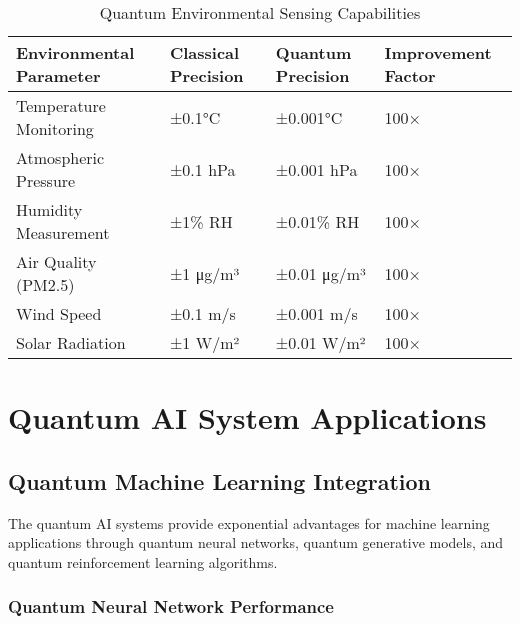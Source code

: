 \documentclass[12pt,a4paper]{report}
\begin{document}
\begin{table}[H]
\centering
\caption{Quantum Environmental Sensing Capabilities}
\begin{tabular}{@{}p{3cm}p{3cm}p{3cm}p{3cm}@{}}
\toprule
\textbf{Environmental Parameter} & \textbf{Classical Precision} & \textbf{Quantum Precision} & \textbf{Improvement Factor} \\
\midrule
Temperature Monitoring & ±0.1°C & ±0.001°C & 100× \\
Atmospheric Pressure & ±0.1 hPa & ±0.001 hPa & 100× \\
Humidity Measurement & ±1\% RH & ±0.01\% RH & 100× \\
Air Quality (PM2.5) & ±1 μg/m³ & ±0.01 μg/m³ & 100× \\
Wind Speed & ±0.1 m/s & ±0.001 m/s & 100× \\
Solar Radiation & ±1 W/m² & ±0.01 W/m² & 100× \\
\bottomrule
\end{tabular}
\end{table}

\section{Quantum AI System Applications}

\subsection{Quantum Machine Learning Integration}

The quantum AI systems provide exponential advantages for machine learning applications through quantum neural networks, quantum generative models, and quantum reinforcement learning algorithms.

\subsubsection{Quantum Neural Network Performance}
\end{document}
